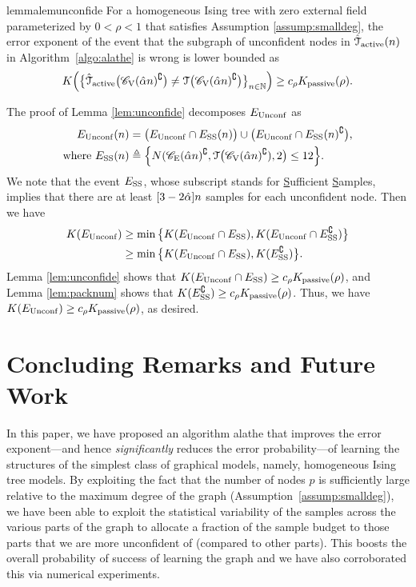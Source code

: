 \begin{restatable}{lemma}{lemunconfide}
\label{lem:unconfide}
For a homogeneous Ising tree with zero external field parameterized by $0<\rho<1$ that satisfies Assumption \ref{assump:smalldeg}, the error exponent of the event that the subgraph of unconfident nodes in $\hat{\mathcal{T}}_{{\rm active}}(n)$ in Algorithm~\ref{algo:alathe} is wrong is lower bounded as
\begin{align}
	K \Big(\big\{\hat{\mathcal{T}}_{{\rm active}}\big(\mathscr{C}_{\mathrm{V}}(\hat{\alpha} n)^{\complement}\big)\neq \mathcal{T}\big(\mathscr{C}_{\mathrm{V}}(\hat{\alpha} n)^{\complement}\big)\big\}_{n\in\mathbb{N}}\Big)\geq c_{\rho}K _{{\rm passive}}(\rho).
\end{align}
\end{restatable}
The proof of Lemma \ref{lem:unconfide} decomposes $E_{{\rm Unconf}}$ as
\begin{align}
	E_{{\rm Unconf}}(n)&=\big(E_{{\rm Unconf}}\cap E_{{\rm SS}}(n)\big)\cup \big(E_{{\rm Unconf}}\cap E_{{\rm SS}}(n)^{\complement}\big)\text{,}\\
	\text{where }E_{{\rm SS}}(n)&\triangleq\Big\{N(\mathscr{C}_{\mathrm{E}}(\hat{\alpha} n)^{\complement},\mathcal{T}\big(\mathscr{C}_{\mathrm{V}}(\hat{\alpha} n)^{\complement}),2\big)\leq 12\Big\}.
\end{align}
We note that the event $E_{{\rm SS}}$, whose subscript stands for \underline{S}ufficient \underline{S}amples, implies that there are at least $[3-2\hat{\alpha}]n$ samples for each unconfident node. Then we have
\begin{align}
	K (E_{{\rm Unconf}})&\geq \min \big\{K (E_{{\rm Unconf}}\cap E_{{\rm SS}}),K (E_{{\rm Unconf}}\cap E_{{\rm SS}}^{\complement})\big\}\\
	&\geq \min\big\{K (E_{{\rm Unconf}}\cap E_{{\rm SS}}),K (E_{{\rm SS}}^{\complement})\big\}.
\end{align}
Lemma \ref{lem:unconfide} shows that $K (E_{{\rm Unconf}}\cap E_{{\rm SS}})\geq c_{\rho}K _{{\rm passive}}(\rho)$, and Lemma \ref{lem:packnum} shows that $K (E_{{\rm SS}}^{\complement})\geq c_{\rho}K _{{\rm passive}}(\rho)$. Thus, we 
have $K (E_{{\rm Unconf}})\geq c_{\rho}K_{{\rm passive}}(\rho)$, as desired.

\section{Concluding Remarks and Future Work} \label{sec:conclusion}
In this paper, we have proposed an algorithm \ac{alathe} that improves the error exponent---and hence {\em significantly} reduces the error probability---of learning the structures of the simplest class of graphical models, namely, homogeneous Ising tree models. By exploiting the fact that the number of nodes $p$ is sufficiently large relative to the maximum degree of the graph (Assumption~\ref{assump:smalldeg}), we have been able to  exploit the statistical variability of the samples across the various parts of the graph to allocate a fraction  of the sample budget to those parts  that we are more unconfident of  (compared to other parts). This boosts the overall probability of success of learning the graph and we have also  corroborated this via  numerical experiments. 

